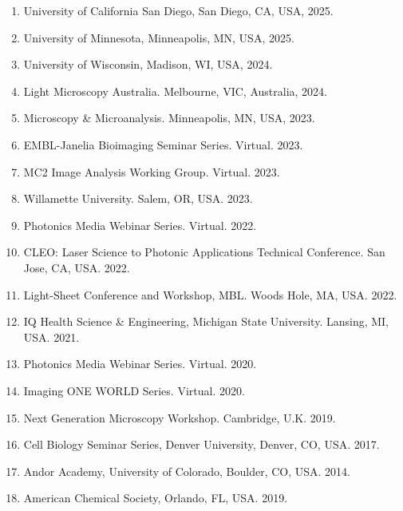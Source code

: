 \begin{enumerate}
\item University of California San Diego, San Diego, CA, USA, 2025.
\item University of Minnesota, Minneapolis, MN, USA, 2025.
\item University of Wisconsin, Madison, WI, USA, 2024.
\item Light Microscopy Australia. Melbourne, VIC, Australia, 2024.
\item Microscopy \& Microanalysis. Minneapolis, MN, USA, 2023.
\item EMBL-Janelia Bioimaging Seminar Series. Virtual. 2023.
\item MC2 Image Analysis Working Group. Virtual. 2023.
\item Willamette University.  Salem, OR, USA. 2023.
\item Photonics Media Webinar Series.   Virtual. 2022.
\item CLEO: Laser Science to Photonic Applications Technical Conference. San Jose, CA, USA. 2022.
\item Light-Sheet Conference and Workshop, MBL.  Woods Hole, MA, USA. 2022.
\item IQ Health Science \& Engineering, Michigan State University. Lansing, MI, USA. 2021.
\item Photonics Media Webinar Series.  Virtual. 2020.
\item Imaging ONE WORLD Series. Virtual. 2020.
\item Next Generation Microscopy Workshop.  Cambridge, U.K. 2019.
\item Cell Biology Seminar Series, Denver University, Denver, CO, USA. 2017.
\item Andor Academy, University of Colorado, Boulder, CO, USA. 2014.
\item American Chemical Society, Orlando, FL, USA. 2019.
\end{enumerate}